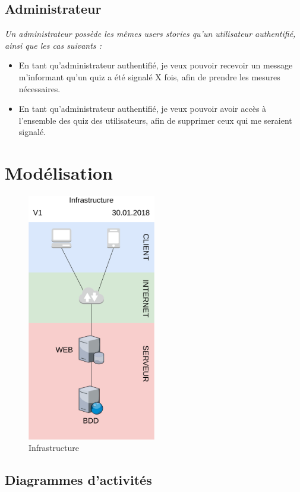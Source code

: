 \documentclass[a4paper, 12pt]{article}
\begin{document}
\subsection{Administrateur}
\textit{Un administrateur possède les mêmes users stories qu’un utilisateur authentifié, ainsi que les cas suivants :}
\begin{itemize}
    \item En tant qu’administrateur authentifié, je veux pouvoir recevoir un message m’informant qu’un quiz a été signalé X fois, afin de prendre les mesures nécessaires.
    \item En tant qu’administrateur authentifié, je veux pouvoir avoir accès à l’ensemble des quiz des utilisateurs, afin de supprimer ceux qui me seraient signalé.
\end{itemize}

\section{Modélisation}
\begin{figure}
	\begin{center}
		\includegraphics[width=0.5\textwidth]{../diagrams/infrastructure.png}
	\end{center}
    \caption{Infrastructure}
\end{figure}
\subsection{Diagrammes d’activités}
\end{document}
